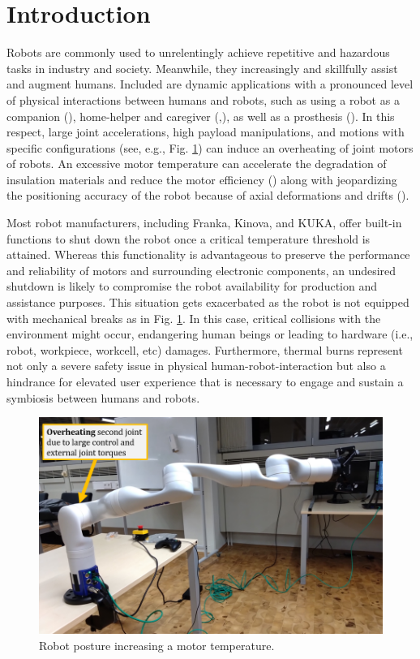 \documentclass{ifacconf}
\begin{document}
\section{Introduction}
Robots are commonly used to unrelentingly achieve repetitive and hazardous tasks in industry and society. Meanwhile, they increasingly and skillfully assist and augment humans. Included are dynamic applications with a pronounced level of physical interactions between humans and robots, such as using a robot as a companion (\cite{basha2025robotic}), home-helper and caregiver (\cite{tsui2025exploring},\cite{gkiolnta2025challenges}), as well as a prosthesis (\cite{kim2025mode}). In this respect, large joint accelerations, high payload manipulations, and motions with specific configurations (see, e.g., Fig. \ref{fig:intro}) can induce an overheating of  joint motors of robots. An excessive motor temperature can accelerate the degradation of insulation materials and reduce the motor efficiency (\cite{yehorov2025study}) along with jeopardizing the positioning accuracy of the robot because of axial  deformations and drifts (\cite{soga2024skillful}). 



Most robot manufacturers, including Franka, Kinova, and KUKA, offer built-in functions to shut down the robot once a critical temperature threshold is attained. Whereas this functionality is advantageous to preserve the performance and reliability of motors and surrounding electronic components, an undesired shutdown is likely to compromise the robot availability for production and assistance purposes. This situation gets exacerbated as the robot is not equipped with mechanical breaks as in Fig. \ref{fig:intro}. In this case, critical collisions with the environment might occur, endangering human beings or leading to hardware (i.e., robot, workpiece, workcell, etc) damages. Furthermore, thermal burns represent  not only  a severe safety issue in physical human-robot-interaction but also a hindrance for elevated user experience that is necessary to engage and sustain a symbiosis between humans and robots.

\begin{figure}[t]
	\centerline{\includegraphics[width=0.97\columnwidth]{pictures/intro.png}}
	\caption{Robot posture increasing a motor temperature.}
	\label{fig:intro}
\end{figure}
\end{document}
